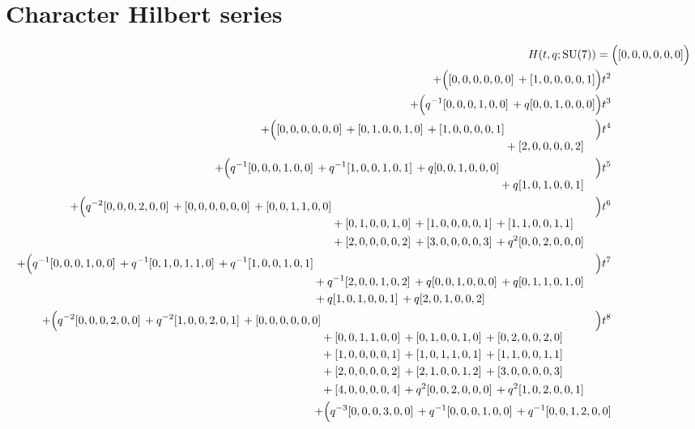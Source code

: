 \documentclass[10pt]{article}
\begin{document}
\section{Character Hilbert series}
\[
\begin{aligned}
H(t,q;\mathrm{SU}(7)) ={}&
   \Bigl([0,0,0,0,0,0]\Bigr) \\
  + \Bigl([0,0,0,0,0,0]\,+[1,0,0,0,0,1]\Bigr)t^{2} \\
  + \Bigl(q^{-1}[0,0,0,1,0,0]\,+q[0,0,1,0,0,0]\Bigr)t^{3} \\
  + \Bigl(\begin{aligned}[t][0,0,0,0,0,0]\,+[0,1,0,0,1,0]\,+[1,0,0,0,0,1] \\
  &{}+[2,0,0,0,0,2]\end{aligned}\Bigr)t^{4} \\
  + \Bigl(\begin{aligned}[t]q^{-1}[0,0,0,1,0,0]\,+q^{-1}[1,0,0,1,0,1]\,+q[0,0,1,0,0,0] \\
  &{}+q[1,0,1,0,0,1]\end{aligned}\Bigr)t^{5} \\
  + \Bigl(\begin{aligned}[t]q^{-2}[0,0,0,2,0,0]\,+[0,0,0,0,0,0]\,+[0,0,1,1,0,0] \\
  &{}+[0,1,0,0,1,0]\,+[1,0,0,0,0,1]\,+[1,1,0,0,1,1] \\
  &{}+[2,0,0,0,0,2]\,+[3,0,0,0,0,3]\,+q^{2}[0,0,2,0,0,0]\end{aligned}\Bigr)t^{6} \\
  + \Bigl(\begin{aligned}[t]q^{-1}[0,0,0,1,0,0]\,+q^{-1}[0,1,0,1,1,0]\,+q^{-1}[1,0,0,1,0,1] \\
  &{}+q^{-1}[2,0,0,1,0,2]\,+q[0,0,1,0,0,0]\,+q[0,1,1,0,1,0] \\
  &{}+q[1,0,1,0,0,1]\,+q[2,0,1,0,0,2]\end{aligned}\Bigr)t^{7} \\
  + \Bigl(\begin{aligned}[t]q^{-2}[0,0,0,2,0,0]\,+q^{-2}[1,0,0,2,0,1]\,+[0,0,0,0,0,0] \\
  &{}+[0,0,1,1,0,0]\,+[0,1,0,0,1,0]\,+[0,2,0,0,2,0] \\
  &{}+[1,0,0,0,0,1]\,+[1,0,1,1,0,1]\,+[1,1,0,0,1,1] \\
  &{}+[2,0,0,0,0,2]\,+[2,1,0,0,1,2]\,+[3,0,0,0,0,3] \\
  &{}+[4,0,0,0,0,4]\,+q^{2}[0,0,2,0,0,0]\,+q^{2}[1,0,2,0,0,1]\end{aligned}\Bigr)t^{8} \\
  + \Bigl(\begin{aligned}[t]q^{-3}[0,0,0,3,0,0]\,+q^{-1}[0,0,0,1,0,0]\,+q^{-1}[0,0,1,2,0,0] \\

\end{aligned}
\end{aligned}\]
\end{document}
